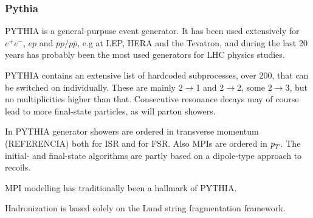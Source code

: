 \subsubsection{Pythia}

PYTHIA is a general-purpuse event generator. It has been used extensively for $e^+ e^-$, $ep$ and $pp/p\bar{p}$, e.g at LEP, HERA and the Tevatron, and during the last 20 years has probably been the most used generators for LHC physics studies. 


PYTHIA contains an extensive list of hardcoded subprocesses, over 200, that can be switched on individually. These are mainly 2$\rightarrow$1 and  2$\rightarrow$2, some  2$\rightarrow$3, but no multiplicities higher than that. Consecutive resonance decays may of course lead to more final-state particles, as will parton showers.

In PYTHIA generator showers are ordered in transverse momentum (REFERENCIA)%
both for ISR and for FSR. Also MPIs are ordered in ${\emph{p}_{T}}$.
The initial- and final-state algorithms are partly based on a dipole-type approach to recoils.

MPI modelling has traditionally been a hallmark of PYTHIA. 

Hadronization is based solely on the Lund string fragmentation framework.





